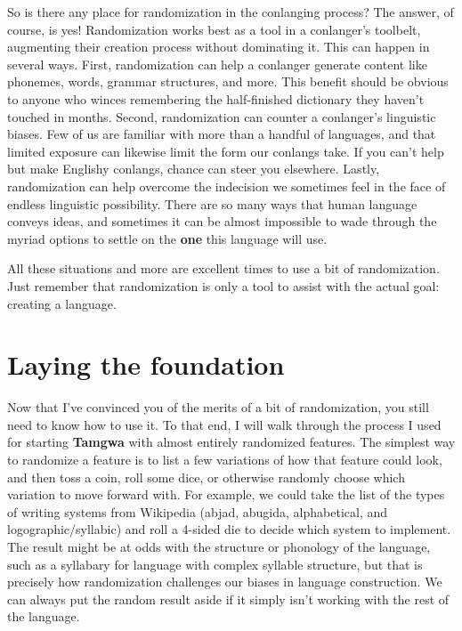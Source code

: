 \documentclass[a4paper,12pt,twoside,openright]{memoir}
\begin{document}
    So is there any place for randomization in the conlanging process?  The answer, of course, is yes!  Randomization works best as a tool in a conlanger's toolbelt, augmenting their creation process without dominating it.  This can happen in several ways.  First, randomization can help a conlanger generate content like phonemes, words, grammar structures, and more.  This benefit should be obvious to anyone who winces remembering the half-finished dictionary they haven't touched in months. Second, randomization can counter a conlanger's linguistic biases.  Few of us are familiar with more than a handful of languages, and that limited exposure can likewise limit the form our conlangs take.  If you can't help but make Englishy conlangs, chance can steer you elsewhere.  Lastly, randomization can help overcome the indecision we sometimes feel in the face of endless linguistic possibility.  There are so many ways that human language conveys ideas, and sometimes it can be almost impossible to wade through the myriad options to settle on the \textbf{one} this language will use.

    All these situations and more are excellent times to use a bit of randomization.  Just remember that randomization is only a tool to assist with the actual goal: creating a language.

\section*{Laying the foundation} %

    Now that I've convinced you of the merits of a bit of randomization, you still need to know how to use it.  To that end, I will walk through the process I used for starting \textbf{Tamgwa} with almost entirely randomized features.  The simplest way to randomize a feature is to list a few variations of how that feature could look, and then toss a coin, roll some dice, or otherwise randomly choose which variation to move forward with.  For example, we could take the list of the types of writing systems from Wikipedia (abjad, abugida, alphabetical, and logographic/syllabic) and roll a 4-sided die to decide which system to implement.  The result might be at odds with the structure or phonology of the language, such as a syllabary for language with complex syllable structure, but that is precisely how randomization challenges our biases in language construction.  We can always put the random result aside if it simply isn't working with the rest of the language.
\end{document}
